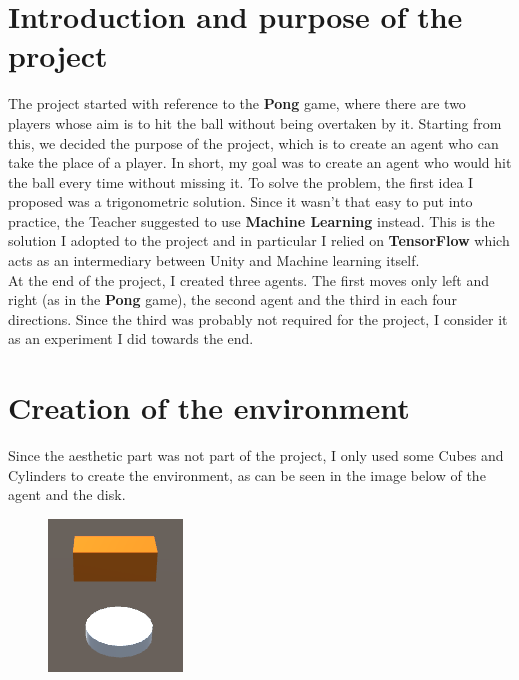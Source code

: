 \documentclass[12pt]{article}
\begin{document}
\begin{titlepage}
		
		\vfill 
		
	\end{titlepage}

	\tableofcontents
	
	\newpage
	
	\section{Introduction and purpose of the project}
	The project started with reference to the \textbf{Pong} game, where there are two players whose aim is to hit the ball without being overtaken by it. Starting from this, we decided the purpose of the project, which is to create an agent who can take the place of a player. In short, my goal was to create an agent who would hit the ball every time without missing it.
	To solve the problem, the first idea I proposed was a trigonometric solution. Since it wasn't that easy to put into practice, the Teacher suggested to use \textbf{Machine Learning} instead. This is the solution I adopted to the project and in particular I relied on \textbf{TensorFlow} which acts as an intermediary between Unity and Machine learning itself.\\
	At the end of the project, I created three agents. The first moves only left and right (as in the \textbf{Pong} game), the second agent and the third in each four directions. Since the third was probably not required for the project, I consider it as an experiment I did towards the end.
	
	\newpage
	
	\section{Creation of the environment}
	Since the aesthetic part was not part of the project, I only used some Cubes and Cylinders to create the environment, as can be seen in the image below of the agent and the disk.
	
	\begin{figure}[hbt!]
		\centering
		\includegraphics[width= 0.3
		\textwidth]{images/Disk&Agent}
	\end{figure} 
\end{document}
